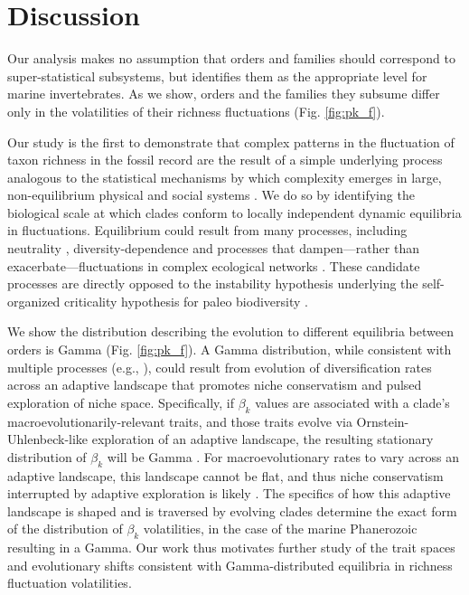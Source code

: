 \documentclass[12pt]{article}
\let\citep=\cite
\begin{document}
\section{Discussion}

Our analysis makes no assumption that orders and families should
correspond to super-statistical subsystems, but identifies them as the
appropriate level for marine invertebrates. As we show, orders and the
families they subsume differ only in the volatilities of their
richness fluctuations (Fig. \ref{fig:pk_f}).

Our study is the first to demonstrate that complex patterns in the
fluctuation of taxon richness in the fossil record are the result of a
simple underlying process analogous to the statistical mechanisms by
which complexity emerges in large, non-equilibrium physical
\citep{beck2004} and social systems \citep{fuentes2009}.  We do so by
identifying the biological scale at which clades conform to locally
independent dynamic equilibria in fluctuations.  Equilibrium could
result from many processes, including neutrality \citep{macWilson,
  hubbell2001, olszewski2004}, diversity-dependence
\citep{rabosky2009ecolLett, moen2014, foote2018} and processes that
dampen---rather than exacerbate---fluctuations in complex ecological
networks \citep{berlow2009}. These candidate processes are directly
opposed to the instability hypothesis underlying the self-organized
criticality hypothesis for paleo biodiversity \citep{bak1993,
  sole1997}.

We show the distribution describing the evolution to different
equilibria between orders is Gamma (Fig. \ref{fig:pk_f}).  A Gamma
distribution, while consistent with multiple processes (e.g.,
\citep{cir1985}), could result from evolution of diversification rates
across an adaptive landscape that promotes niche conservatism and
pulsed exploration of niche space.  Specifically, if $\beta_k$ values
are associated with a clade's macroevolutionarily-relevant traits, and
those traits evolve via Ornstein-Uhlenbeck-like exploration of an
adaptive landscape, the resulting stationary distribution of $\beta_k$
will be Gamma \citep{cir1985, butler2004}.  For macroevolutionary
rates to vary across an adaptive landscape, this landscape cannot be
flat, and thus niche conservatism interrupted by adaptive exploration
is likely \citep{newman1985adaptive, gavrilets2004book}. The specifics
of how this adaptive landscape is shaped and is traversed by evolving
clades determine the exact form of the distribution of $\beta_k$
volatilities, in the case of the marine Phanerozoic resulting in a
Gamma. Our work thus motivates further study of the trait spaces and
evolutionary shifts consistent with Gamma-distributed equilibria in
richness fluctuation volatilities.
\end{document}
